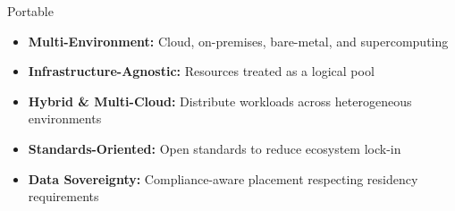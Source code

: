 \begin{frame}{Portable}
	\begin{itemize}
		\item \textbf{Multi-Environment:} Cloud, on-premises, bare-metal, and supercomputing
		\item \textbf{Infrastructure-Agnostic:} Resources treated as a logical pool
		\item \textbf{Hybrid \& Multi-Cloud:} Distribute workloads across heterogeneous environments
		\item \textbf{Standards-Oriented:} Open standards to reduce ecosystem lock-in
		\item \textbf{Data Sovereignty:} Compliance-aware placement respecting residency requirements
	\end{itemize}
\end{frame}

